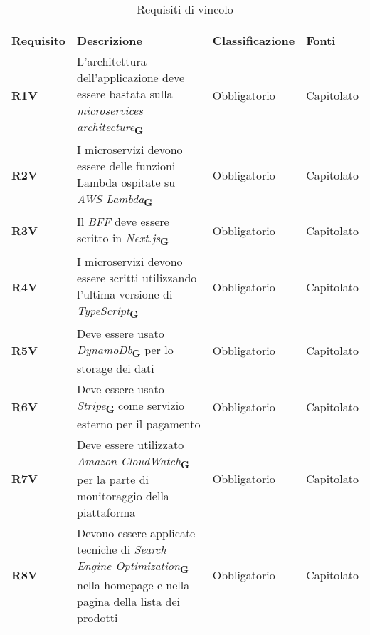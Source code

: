 \begin{center}
    \centering
    \renewcommand{\arraystretch}{1.8}
    \label{tab:RequisitiVincolo}
    \begin{longtable}[!h]{p{50px} p{200px} p{100px} p{50px}}
        \rowcolor{white}\caption{Requisiti di vincolo}                                                                                                                                                                                               \\
        \rowcolor{logo!70} \textbf{Requisito} & \textbf{Descrizione}                                                                                                                                     & \textbf{Classificazione} & \textbf{Fonti} \\
        \textbf{R1V}                          & L'architettura dell'applicazione deve essere bastata sulla \textit{microservices architecture}\textsubscript{\textbf{G}}                                 & Obbligatorio             & Capitolato     \\
        \textbf{R2V}                          & I microservizi devono essere delle funzioni \newline Lambda ospitate su \textit{AWS Lambda}\textsubscript{\textbf{G}}                                    & Obbligatorio             & Capitolato     \\
        \textbf{R3V}                          & Il \textit{BFF} deve essere scritto in \textit{Next.js}\textsubscript{\textbf{G}}                                                                        & Obbligatorio             & Capitolato     \\
        \textbf{R4V}                          & I microservizi devono essere scritti utilizzando l'ultima versione di \textit{TypeScript}\textsubscript{\textbf{G}}                                      & Obbligatorio             & Capitolato     \\
        \textbf{R5V}                          & Deve essere usato \textit{DynamoDb}\textsubscript{\textbf{G}} per lo storage dei dati                                                                    & Obbligatorio             & Capitolato     \\
        \textbf{R6V}                          & Deve essere usato \textit{Stripe}\textsubscript{\textbf{G}} come servizio esterno per il pagamento                                                       & Obbligatorio             & Capitolato     \\
        \textbf{R7V}                          & Deve essere utilizzato \textit{Amazon CloudWatch}\textsubscript{\textbf{G}} per la parte di monitoraggio della piattaforma                               & Obbligatorio             & Capitolato     \\
        \textbf{R8V}                          & Devono essere applicate tecniche di \textit{Search Engine Optimization}\textsubscript{\textbf{G}} nella homepage e nella pagina della lista dei prodotti & Obbligatorio             & Capitolato     \\
    \end{longtable}
\end{center}

